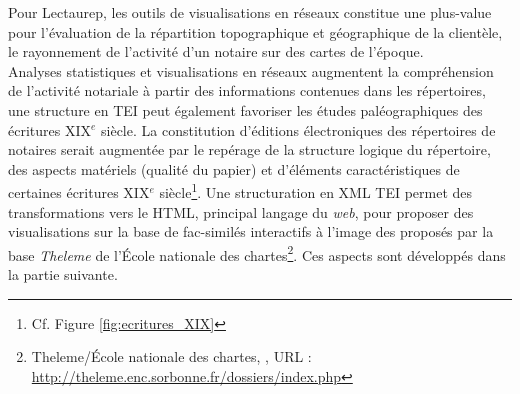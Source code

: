 Pour Lectaurep, les outils de visualisations en réseaux constitue une plus-value pour l'évaluation de la répartition topographique et géographique de la clientèle, le rayonnement de l'activité d'un notaire sur des cartes de l'époque.\\ %

Analyses statistiques et visualisations en réseaux augmentent la compréhension de l'activité notariale à partir des informations contenues dans les répertoires, une structure en TEI peut également favoriser les études paléographiques des écritures XIX$^{e}$ siècle. La constitution d'éditions électroniques des répertoires de notaires serait augmentée par le repérage de la structure logique du répertoire, des aspects matériels (qualité du papier) et d'éléments caractéristiques de certaines écritures XIX$^{e}$ siècle\footnote{Cf. Figure \ref{fig:ecritures_XIX}}. Une structuration en XML TEI permet des transformations vers le HTML, principal langage du \textit{web}, pour proposer des visualisations sur la base de fac-similés interactifs à l'image des  proposés par la base \textit{Theleme} de l'École nationale des chartes\footnote{Theleme/École nationale des chartes, , URL : \url{http://theleme.enc.sorbonne.fr/dossiers/index.php}}. Ces aspects sont développés dans la partie suivante.
\newpage
\thispagestyle{empty}

